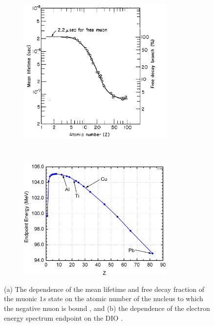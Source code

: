 \begin{figure}[!h]
    \centering
    \begin{subfigure}[t]{0.5\textwidth}
        \centering
        \includegraphics[width=0.85\textwidth]{figures/png/lifetime_mu_matter.png}
        \caption{}
        \label{fig:muonicatom}
    \end{subfigure}%
    ~ 
    \begin{subfigure}[t]{0.5\textwidth}
        \centering
        \includegraphics[width=0.85\textwidth]{figures/png/endopint.png}
        \caption{}
        \label{fig:endpoint}
    \end{subfigure}
   \caption[The muonic atom mean lifetime and muonic free decay fraction. The dependence 
   of the electron energy spectrum endpoint
   on the DIO.]{(a) The dependence of the mean lifetime and free decay fraction 
   of the muonic $1s$ state on the atomic number of the nucleus to which 
   the negative muon is bound \cite{TYamazaki_1975}, and (b) 
   the dependence of the electron 
   energy spectrum endpoint on the DIO \cite{dukes}.}
    \label{fig:2imins}
  \end{figure}
